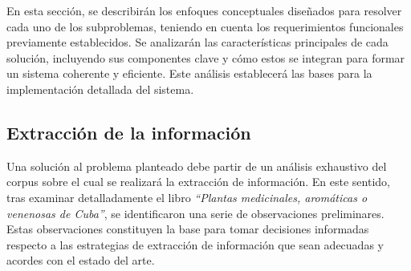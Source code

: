 En esta sección, se describirán los enfoques conceptuales diseñados para resolver cada 
uno de los subproblemas, teniendo en cuenta los requerimientos funcionales previamente establecidos. 
Se analizarán las características principales de cada solución, incluyendo sus componentes clave y cómo 
estos se integran para formar un sistema coherente y eficiente. Este análisis establecerá las bases 
para la implementación detallada del sistema.


\subsection{Extracción de la información}
Una solución al problema planteado debe partir de un análisis exhaustivo del corpus sobre el cual se 
realizará la extracción de información. En este sentido, tras examinar detalladamente el libro 
\textit{``Plantas medicinales, aromáticas o venenosas de Cuba''}, se identificaron una serie de observaciones 
preliminares. Estas observaciones constituyen la base para tomar decisiones informadas respecto 
a las estrategias de extracción de información que sean adecuadas y acordes con el estado del arte.

